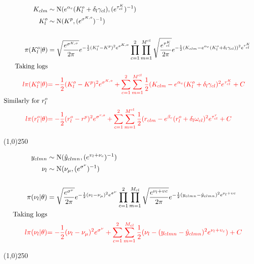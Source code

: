 \begin{align*}
K_{clm} &\sim \operatorname{N}(e^{\alpha_{c}}(K_{l}^o+\delta_{l}\gamma_{cl}),(e^{ \tau_{cl}^K })^{-1})\\
K_{l}^o &\sim \operatorname{N}(K^p, (e^{ \sigma^{K,o} })^{-1} )\\
\\
\pi(K_{l}^o |\theta)&=\sqrt{\frac{e^{ \sigma^{K,o} }}{2\pi}} e^{-\frac{1}{2}(K_{l}^o-K^p)^{2}e^{ \sigma^{K,o} } }
\prod_{c=1}^{2}\prod_{m=1}^{M^{cl}}\sqrt{\frac{e^{ \tau_{cl}^K }}{2\pi}} e^{-\frac{1}{2}(K_{clm}-e^{\alpha_{c}}(K_{l}^o+\delta_{l}\gamma_{cl}))^{2}e^{ \tau_{cl}^K } }\\
\text{Taking logs}\\
\color{red}{l\pi(K_{l}^o |\theta)}&
\color{red}{
=-\frac{1}{2}(K_{l}^o-K^p)^{2}e^{ \sigma^{K,o} } 
+
\sum_{c=1}^{2}\sum_{m=1}^{M^{cl}}\frac{1}{2}(K_{clm}-e^{\alpha_{c}}(K_{l}^o+\delta_{l}\gamma_{cl})^{2}e^{\tau_{cl}^K}
+C}\\
\text{Similarly for $r_{l}^o$}\\
\color{red}{l\pi(r_{l}^o |\theta)}&
\color{red}{
=-\frac{1}{2}(r_{l}^o-r^p)^{2}e^{ \sigma^{r,o} } 
+
\sum_{c=1}^{2}\sum_{m=1}^{M^{cl}}\frac{1}{2}(r_{clm}-e^{\beta_{c}}(r_{l}^o+\delta_{l}\omega_{cl})^{2}e^{\tau_{cl}^r}
+C}
\end{align*}

\begin{center}
\line(1,0){250}
\end{center}

\begin{align*}
y_{clmn} &\sim \operatorname{N}(\hat{y}_{clmn},(e^{ \upsilon_{l}+\nu_{c}  })^{-1} ) \\
\nu_{l} &\sim \operatorname{N}(\nu_{\mu},(e^{ \sigma^{\nu} })^{-1})\\
\\
\pi(\nu_{l}|\theta)&=\sqrt{\frac{e^{ \sigma^{\nu} }}{2\pi}} e^{-\frac{1}{2}(\nu_{l}-\nu_{\mu})^{2}e^{ \sigma^{\nu} } }
\prod_{c=1}^{2}\prod_{m=1}^{M_{cl}}\sqrt{\frac{e^{ \nu_{l}+\upsilon{c} }}{2\pi}} e^{-\frac{1}{2}(y_{clmn}-\hat{y}_{clmn})^{2}e^{ \nu_{l}+\upsilon{c} } }\\
\text{Taking logs}\\
\color{red}{l\pi(\nu_{l}|\theta)}&
\color{red}{
=-\frac{1}{2}(\nu_{l}-\nu_{\mu})^{2}e^{ \sigma^{\nu} } 
+
\sum_{c=1}^{2}\sum_{m=1}^{M_{cl}}\frac{1}{2}(\nu_{l}-(y_{clmn}-\hat{y}_{clmn})^{2}e^{ \nu_{l} +\upsilon_{c} })
+C}
\end{align*}

\begin{center}
\line(1,0){250}
\end{center}

